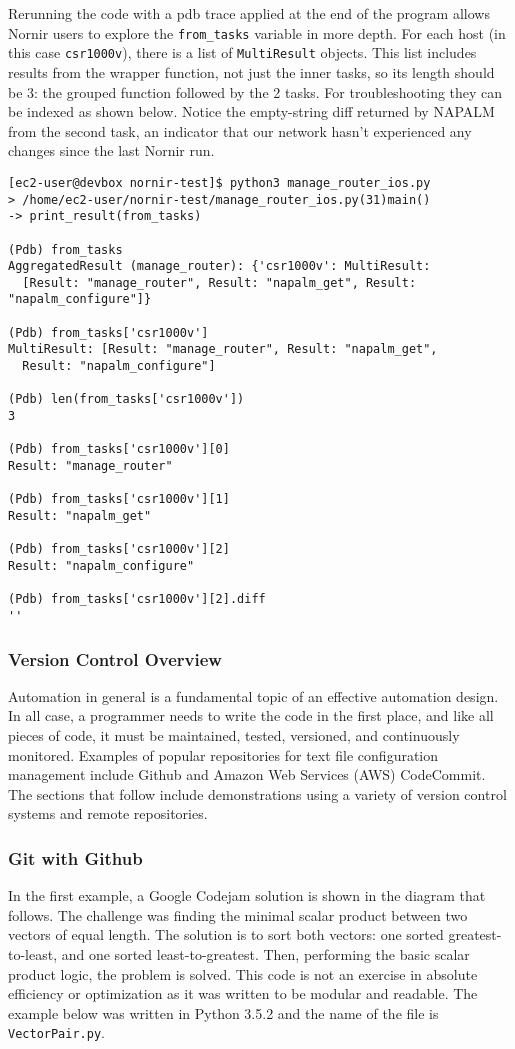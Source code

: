 Rerunning the code with a pdb trace applied at the end of the program allows
Nornir users to explore the \verb|from_tasks| variable in more depth. For each
host (in this case \verb|csr1000v|), there is a list of \verb|MultiResult| objects.
This list includes results from the wrapper function, not just the inner tasks, so
its length should be 3: the grouped function followed by the 2 tasks. For
troubleshooting they can be indexed as shown below. Notice the empty-string
diff returned by NAPALM from the second task, an indicator that our network
hasn't experienced any changes since the last Nornir run.

\begin{verbatim}
[ec2-user@devbox nornir-test]$ python3 manage_router_ios.py
> /home/ec2-user/nornir-test/manage_router_ios.py(31)main()
-> print_result(from_tasks)

(Pdb) from_tasks
AggregatedResult (manage_router): {'csr1000v': MultiResult:
  [Result: "manage_router", Result: "napalm_get", Result: "napalm_configure"]}

(Pdb) from_tasks['csr1000v']
MultiResult: [Result: "manage_router", Result: "napalm_get",
  Result: "napalm_configure"]

(Pdb) len(from_tasks['csr1000v'])
3

(Pdb) from_tasks['csr1000v'][0]
Result: "manage_router"

(Pdb) from_tasks['csr1000v'][1]
Result: "napalm_get"

(Pdb) from_tasks['csr1000v'][2]
Result: "napalm_configure"

(Pdb) from_tasks['csr1000v'][2].diff
''
\end{verbatim}

\subsubsection{Version Control Overview}
Automation in general is a fundamental topic of an effective automation
design. In all case, a programmer needs to write the code in the first
place, and like all pieces of code, it must be maintained, tested, versioned,
and continuously monitored. Examples of popular repositories for text file
configuration management include Github and Amazon Web Services (AWS) CodeCommit.
The sections that follow include demonstrations using a variety of version
control systems and remote repositories.

\subsubsection{Git with Github}
In the first example, a Google Codejam solution is shown in the diagram that
follows. The challenge was finding the minimal scalar product between two
vectors of equal length. The solution is to sort both vectors: one sorted
greatest-to-least, and one sorted least-to-greatest. Then, performing the
basic scalar product logic, the problem is solved. This code is not an
exercise in absolute efficiency or optimization as it was written to be
modular and readable. The example below was written in Python 3.5.2 and
the name of the file is \verb|VectorPair.py|.

